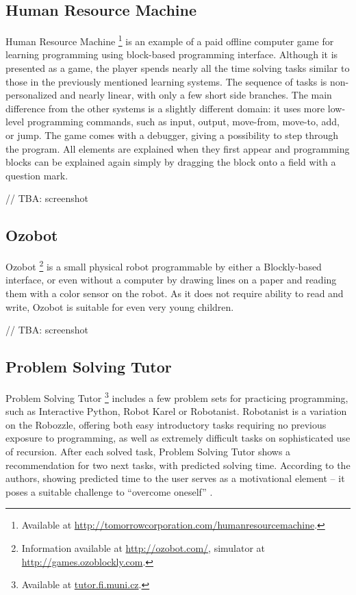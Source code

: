 \subsection{Human Resource Machine}
\label{sec:human-resource-machine}
Human Resource Machine%
\footnote{Available at \url{http://tomorrowcorporation.com/humanresourcemachine}.}
is an example of a paid offline computer game for learning programming using block-based programming interface.
Although it is presented as a game,
the player spends nearly all the time solving tasks similar to those in the previously mentioned learning systems.
The sequence of tasks is non-personalized and nearly linear,
with only a few short side branches.
The main difference from the other systems is a slightly different domain:
it uses more low-level programming commands, such as
input, output, move-from, move-to, add, or jump.
The game comes with a debugger, giving a possibility to step through the program.
All elements are explained when they first appear and programming blocks can be explained again simply by dragging the block onto a field with a question mark.

// TBA: screenshot


\subsection{Ozobot}
\label{sec:ozobot}
Ozobot%
\footnote{Information available at \url{http://ozobot.com/}, simulator at \url{http://games.ozoblockly.com}.}
is a small physical robot
programmable by either a Blockly-based interface,
  or even without a computer
  by drawing lines on a paper and reading them with a color sensor on the robot.
As it does not require ability to read and write,
  Ozobot is suitable for even very young children.

// TBA: screenshot


\subsection{Problem Solving Tutor}
\label{sec:problem-solving-tutor}
Problem Solving Tutor%
\footnote{Available at \url{tutor.fi.muni.cz}.}
includes a few problem sets for practicing programming,
such as Interactive Python, Robot Karel or Robotanist.
Robotanist is a variation on the Robozzle,
offering both easy introductory tasks requiring no previous exposure to programming,
as well as extremely difficult tasks on sophisticated use of recursion.
After each solved task, Problem Solving Tutor shows a recommendation for two next tasks,
with predicted solving time.
According to the authors, showing predicted time to the user serves as a motivational element
-- it poses a suitable challenge to ``overcome oneself''
\cite{pelanek-student-modeling-times}.

